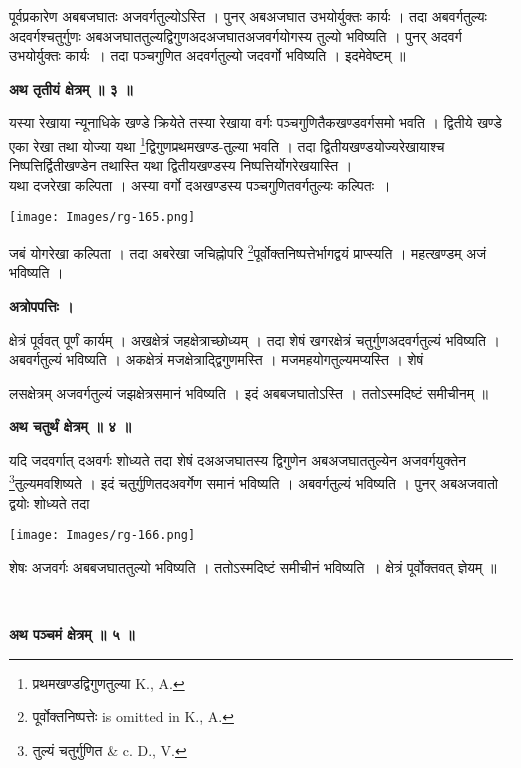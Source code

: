 \documentclass[11pt, openany]{book}
\begin{document}
{\ab पूर्वप्रकारेण अबबजघातः अजवर्गतुल्योऽस्ति । पुनर् अबअजघात उभयोर्युक्तः कार्यः । तदा अबवर्गतुल्यः अदवर्गश्चतुर्गुणः अबअजघाततुल्यद्विगुणअदअजघातअजवर्गयोगस्य तुल्यो भविष्यति । पुनर् अदवर्ग उभयोर्युक्तः कार्यः~। तदा पञ्चगुणित अदवर्गतुल्यो जदवर्गो भविष्यति । इदमेवेष्टम् ॥}\\
\begin{center}
\textbf{\large अथ तृतीयं क्षेत्रम् ॥ ३ ॥ }
\end{center}
\vspace{2mm}

{\ab यस्या रेखाया न्यूनाधिके खण्डे क्रियेते तस्या रेखाया वर्गः पञ्चगुणितैकखण्डवर्गसमो भवति । द्वितीये खण्डे एका रेखा तथा योज्या यथा \renewcommand{\thefootnote}{२}\footnote{प्रथमखण्डद्विगुणतुल्या {\en K., A.}}द्विगुणप्रथमखण्ड-तुल्या भवति । तदा द्वितीयखण्डयोज्यरेखायाश्च निष्पत्तिर्द्वितीखण्डेन तथास्ति यथा द्वितीयखण्डस्य निष्पत्तिर्योगरेखयास्ति । }\\

 यथा दजरेखा कल्पिता । अस्या वर्गो दअखण्डस्य पञ्चगुणितवर्गतुल्यः कल्पितः~।\\

\begin{center}
\noindent \texttt{[image: Images/rg-165.png]}  
\end{center}
जबं योगरेखा कल्पिता । तदा अबरेखा जचिह्नोपरि \renewcommand{\thefootnote}{3}\footnote{ पूर्वोक्तनिष्पत्तेः {\en is omitted in K., A.}}पूर्वोक्तनिष्पत्तेर्भागद्वयं प्राप्स्यति ।
महत्खण्डम् अजं भविष्यति । \\

\begin{center}
\textbf{ अत्रोपपत्तिः । }
\end{center}
\vspace{2mm}

 क्षेत्रं पूर्ववत् पूर्णं कार्यम् । अखक्षेत्रं जहक्षेत्राच्छोध्यम् । तदा शेषं खगरक्षेत्रं चतुर्गुणअदवर्गतुल्यं भविष्यति । अबवर्गतुल्यं भविष्यति । अकक्षेत्रं मजक्षेत्राद्द्विगुणमस्ति । मजमहयोगतुल्यमप्यस्ति ।
शेषं 

\newpage
\noindent लसक्षेत्रम् अजवर्गतुल्यं जझक्षेत्रसमानं भविष्यति । इदं अबबजघातोऽस्ति । ततोऽस्मदिष्टं समीचीनम् ॥\\
\begin{center}
\textbf{\large अथ चतुर्थं क्षेत्रम् ॥ ४ ॥ }
\end{center}
\vspace{2mm}

{\ab यदि जदवर्गात् दअवर्गः शोध्यते तदा शेषं दअअजघातस्य द्विगुणेन अबअजघाततुल्येन अजवर्गयुक्तेन \renewcommand{\thefootnote}{१}\footnote{तुल्यं चतुर्गुणित {\en \& c. D., V.}}तुल्यमवशिष्यते । इदं चतुर्गुणितदअवर्गेण समानं भविष्यति । अबवर्गतुल्यं भविष्यति । पुनर् अबअजवातो द्वयोः शोध्यते तदा
\begin{center}
\noindent \texttt{[image: Images/rg-166.png]}  
\end{center}
शेषः अजवर्गः अबबजघाततुल्यो भविष्यति । ततोऽस्मदिष्टं समीचीनं भविष्यति~। क्षेत्रं पूर्वोक्तवत् ज्ञेयम् ॥ }\\
\begin{center}
\textbf{\large अथ पञ्चमं क्षेत्रम् ॥ ५ ॥ }
\end{center}
\vspace{2mm}
\end{document}
